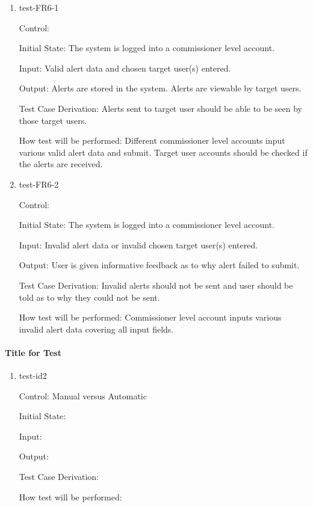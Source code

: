 \documentclass[12pt, titlepage]{article}
\begin{document}
\begin{enumerate}

  \item{test-FR6-1\\}

  Control: 

  Initial State: The system is logged into a commissioner level account.
            
  Input: Valid alert data and chosen target user(s) entered.
            
  Output: Alerts are stored in the system. Alerts are viewable by target users.

  Test Case Derivation: Alerts sent to target user should be able to be 
  seen by those target users.

  How test will be performed: Different commissioner level accounts input
  various valid alert data and submit. Target user accounts should be checked
  if the alerts are received.

  \item{test-FR6-2\\}

  Control: 

  Initial State: The system is logged into a commissioner level account.
            
  Input: Invalid alert data or invalid chosen target user(s) entered.
            
  Output: User is given informative feedback as to why alert failed to submit.

  Test Case Derivation: Invalid alerts should not be sent and user should
  be told as to why they could not be sent.

  How test will be performed: Commissioner level account inputs various invalid
  alert data covering all input fields.

\end{enumerate}
		
\paragraph{Title for Test}

\begin{enumerate}

\item{test-id2\\}

Control: Manual versus Automatic
					
Initial State: 
					
Input: 
					
Output: 

Test Case Derivation: 

How test will be performed: 

\end{enumerate}
\end{document}
